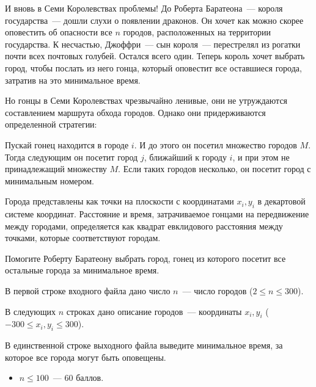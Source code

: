 
И вновь в Семи Королевствах проблемы! До Роберта Баратеона~--- короля государства~--- дошли слухи о появлении драконов. 
Он хочет как можно скорее оповестить об опасности все $n$ городов, расположенных на территории государства. 
К несчастью, Джоффри~--- сын короля~--- перестрелял из рогатки почти всех почтовых голубей. Остался всего один. Теперь король
хочет выбрать город, чтобы послать из него гонца, который оповестит все оставшиеся города, затратив на это минимальное время.

Но гонцы в Семи Королевствах чрезвычайно ленивые, они не утруждаются составлением маршрута обхода городов. 
Однако они придерживаются определенной стратегии:

Пускай гонец находится в городе $i$. И до этого он посетил множество городов $M$. Тогда следующим он посетит город $j$, ближайший
к городу $i$, и при этом не принадлежащий множеству $M$. Если таких городов несколько, он посетит город с минимальным номером.

Города представлены как точки на плоскости с координатами $x_i, y_i$ в декартовой системе координат. Расстояние и время, затрачиваемое
гонцами на передвижение между городами, определяется как квадрат евклидового расстояния между точками, которые соответствуют городам. 

Помогите Роберту Баратеону выбрать город, гонец из которого посетит все остальные города за минимальное время.

\Input
В первой строке входного файла дано число $n$~--- число городов ($2 \le n \le 300$). 

В следующих $n$ строках дано описание городов~--- координаты $x_i, y_i$ ($-300 \le x_i, y_i \le 300$).
 
\Output                                                         
В единственной строке выходного файла выведите минимальное время, за которое все города могут быть оповещены.

\Samples
\BeginTests
\EndTests

\Scoring
\begin{itemize}
	\item $n \le 100$~--- 60 баллов.
\end{itemize}

\EndProblem
